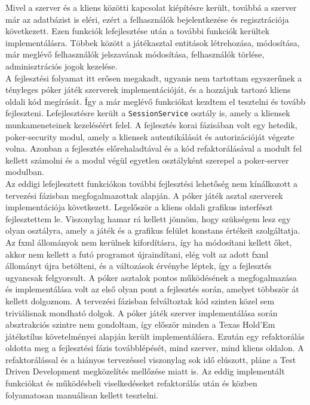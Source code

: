 Mivel a szerver és a kliens közötti kapcsolat kiépítésre került, továbbá a szerver már az adatbázist is eléri, ezért a felhasználók bejelentkezése és regisztrációja következett. Ezen funkciók lefejlesztése után a további funkciók kerültek implementálásra. Többek között a játékasztal entitások létrehozása, módosítása, már meglévő felhasználók jelszavának módosítása, felhasználók törlése, adminisztrációs jogok kezelése. \\
A fejlesztési folyamat itt erősen megakadt, ugyanis nem tartottam egyszerűnek a tényleges póker játék szerverek implementációját, és a hozzájuk tartozó kliens oldali kód megírását. Így a már meglévő funkciókat kezdtem el tesztelni és tovább fejleszteni. Lefejlesztésre került a \texttt{SessionService} osztály is, amely a kliensek munkameneteinek kezeléséért felel. A fejlesztés korai fázisában volt egy hetedik, poker-security modul, amely a kliensek autentikálását és autorizációját végezte volna. Azonban a fejlesztés előrehaladtával és a kód refaktorálásával a modult fel kellett számolni és a modul végül egyetlen osztályként szerepel a poker-server modulban. \\
Az eddigi lefejlesztett funkciókon további fejlesztési lehetőség nem kínálkozott a tervezési fázisban megfogalmazottak alapján. A póker játék asztal szerverek implementációja következett. Legelőször a kliens oldali grafikus interfészt fejlesztettem le. Viszonylag hamar rá kellett jönnöm, hogy szükségem lesz egy olyan osztályra, amely a játék és a grafikus felület konstans értékeit szolgáltatja. Az fxml állományok nem kerülnek kifordításra, így ha módosítani kellett őket, akkor nem kellett a futó programot újraindítani, elég volt az adott fxml állományt újra betölteni, és a változások érvénybe léptek, így a fejlesztés ugyancsak felgyorsult. A póker asztalok pontos működésének a megfogalmazása és implementálása volt az első olyan pont a fejlesztés során, amelyet többször át kellett dolgoznom. A tervezési fázisban felváltoztak kód szinten közel sem triviálisnak mondható dolgok. A póker játék szerver implementálása során absztrakciós szintre nem gondoltam, így először minden a Texas Hold'Em játékstílus követelményei alapján került implementálásra. Ezután egy refaktorálás oldotta meg a fejlesztési fázis továbblépését, mind szerver, mind kliens oldalon. A refaktorálással és a hiányos tervezéssel viszonylag sok idő elúszott, pláne a Test Driven Development megközelítés mellőzése miatt is. Az eddig implementált funkciókat és működésbeli viselkedéseket refaktorálás után és közben folyamatosan manuálisan kellett tesztelni. \\
